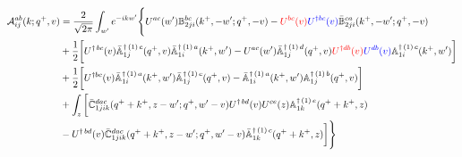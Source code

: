 \documentclass[10pt]{article}
\def\mf#1{\mathbb{#1}}
\numberwithin{equation}{section}
\begin{document}
\begin{align}
     {\cal A}^{ab}_{ij}(k; q^+, v) & = \frac{2}{\sqrt{2\pi}} \int_{w^{\prime}}e^{-i k w^\prime}\Bigg\{U^{ac}(w^{\prime}) \mf{B}^{bc}_{2ji}(k^{+},-w^{\prime};q^{+},-v)-\textcolor{red}{U^{bc}(v)}\textcolor{blue}{U^{\dagger bc}(v)}\Bar{\mf{B}}^{ca}_{2ji}(k^{+},-w^{\prime}; q^{+},-v)\notag \\ & +\frac{1}{2}\bigg[U^{\dagger\, bc}(v)\Bar{\mf{A}}^{\dagger\,(1)\, c}_{1j}(q^{+},v)\Bar{\mf{A}}^{\dagger\,(1)\, a}_{1i}(k^{+},w^{\prime})-U^{ac}(w^{\prime}) \Bar{\mf{A}}^{\dagger\,(1)\, d}_{1j}(q^{+},v)\textcolor{red}{U^{\dagger db}(v)}\textcolor{blue}{U^{db}(v)} \mf{A}^{\dagger\,(1)\, c}_{1i}(k^{+},w^{\prime})\bigg]\notag \\ & +\frac{1}{2}\bigg[U^{\dagger bc}(v)\Bar{\mf{A}}^{\dagger\, (1)\, a}_{1i}(k^{+},w^{\prime})\Bar{\mf{A}}^{\dagger \, (1)\, c}_{1j}(q^{+},v)-\Bar{\mf{A}}^{\dagger\,(1)\, a}_{1i}(k^{+},w^{\prime}) \mf{A}^{\dagger\,(1)\, b}_{1j}(q^{+},v)\bigg]\notag \\ & +\int_{z}\bigg[\Bar{\mf{C}}^{dac}_{1jik}(q^{+}+k^{+},z-w^{\prime}; q^{+},w^{\prime}-v)U^{\dagger\, bd}(v)U^{ce}(z) \mf{A}^{\dagger\,(1)\,e}_{1k}(q^{+}+k^{+},z)\notag \\ &-U^{\dagger\, bd}(v) \Bar{\mf{C}}^{dac}_{1jik}(q^{+}+k^{+},z-w^{\prime}; q^{+},w^{\prime}-v)\Bar{\mf{A}}^{\dagger\,(1)\,c}_{1k}(q^{+}+k^{+},z)\bigg]\Bigg\}
\end{align}
\end{document}
